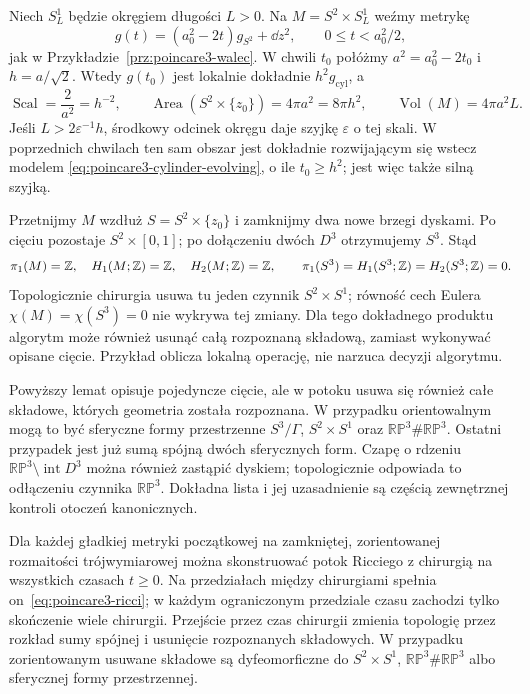 \begin{przyklad}
\label{prz:poincare3-cylinder-surgery}
Niech $S^1_L$ będzie okręgiem długości $L>0$.
Na $M=S^2\times S^1_L$ weźmy metrykę
\[
 g(t)=(a_0^2-2t)g_{S^2}+\dd z^2,
 \qquad 0\leq t<a_0^2/2,
\]
jak w Przykładzie~\ref{prz:poincare3-walec}.
W chwili $t_0$ połóżmy
$a^2=a_0^2-2t_0$ i $h=a/\sqrt2$.
Wtedy $g(t_0)$ jest lokalnie dokładnie
$h^2g_{\mathrm{cyl}}$, a
\[
 \operatorname{Scal}=\frac{2}{a^2}=h^{-2},
 \qquad
 \operatorname{Area}(S^2\times\{z_0\})
 =4\pi a^2=8\pi h^2,
 \qquad
 \operatorname{Vol}(M)=4\pi a^2L.
\]
Jeśli $L>2\varepsilon^{-1}h$, środkowy
odcinek okręgu daje szyjkę
$\varepsilon$ o tej skali. W poprzednich
chwilach ten sam obszar jest dokładnie
rozwijającym się wstecz modelem
\eqref{eq:poincare3-cylinder-evolving},
o ile $t_0\geq h^2$; jest więc także
silną szyjką.

Przetnijmy $M$ wzdłuż
$S=S^2\times\{z_0\}$ i zamknijmy dwa
nowe brzegi dyskami. Po cięciu pozostaje
$S^2\times[0,1]$; po dołączeniu dwóch
$D^3$ otrzymujemy $S^3$. Stąd
\[
 \pi_1(M)=\mathbb{Z},\quad H_1(M;\mathbb{Z})=\mathbb{Z},
 \quad H_2(M;\mathbb{Z})=\mathbb{Z},
 \qquad
 \pi_1(S^3)=H_1(S^3;\mathbb{Z})=H_2(S^3;\mathbb{Z})=0.
\]
Topologicznie chirurgia usuwa tu jeden
czynnik $S^2\times S^1$; równość cech
Eulera $\chi(M)=\chi(S^3)=0$ nie wykrywa
tej zmiany. Dla tego dokładnego produktu
algorytm może również usunąć całą
rozpoznaną składową, zamiast wykonywać
opisane cięcie. Przykład oblicza lokalną
operację, nie narzuca decyzji algorytmu.
\end{przyklad}

\begin{uwaga}
\label{rem:poincare3-discarded}
Powyższy lemat opisuje pojedyncze cięcie,
ale w potoku usuwa się również całe składowe,
których geometria została rozpoznana. W przypadku
orientowalnym mogą to być sferyczne formy
przestrzenne $S^3/\Gamma$, $S^2\times S^1$
oraz $\mathbb{RP}^3\#\mathbb{RP}^3$.
Ostatni przypadek jest już sumą spójną
dwóch sferycznych form. Czapę o rdzeniu
$\mathbb{RP}^3\setminus\operatorname{int}D^3$
można również zastąpić dyskiem; topologicznie
odpowiada to odłączeniu czynnika
$\mathbb{RP}^3$.
Dokładna lista i jej uzasadnienie są częścią
zewnętrznej kontroli otoczeń kanonicznych.
\end{uwaga}

\begin{twierdzenie}
\label{thm:poincare3-surgery-flow}
Dla każdej gładkiej metryki początkowej
na zamkniętej, zorientowanej rozmaitości trójwymiarowej
można skonstruować potok Ricciego z chirurgią
na wszystkich czasach $t\geq0$.
Na przedziałach między chirurgiami spełnia
on~\eqref{eq:poincare3-ricci}; w każdym
ograniczonym przedziale czasu zachodzi tylko
skończenie wiele chirurgii. Przejście przez
czas chirurgii zmienia topologię przez
rozkład sumy spójnej i usunięcie rozpoznanych
składowych. W przypadku zorientowanym
usuwane składowe są dyfeomorficzne do
$S^2\times S^1$, $\mathbb{RP}^3\#\mathbb{RP}^3$
albo sferycznej formy przestrzennej.
\end{twierdzenie}

